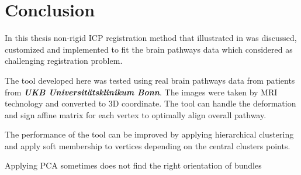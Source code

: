 \documentclass[../structure.tex]{subfiles}
\begin{document}
\chapter{Conclusion}
In this thesis non-rigid ICP registration method that illustrated in \cite{Amberg2007} was discussed, customized and implemented to fit the brain pathways data which considered as challenging registration problem. 

The tool developed here was tested using real brain pathways data from patients from \textbf{\textit{UKB Universitätsklinikum Bonn}}. The images were taken by MRI technology and converted to 3D coordinate. The tool can handle the deformation and sign affine matrix for each vertex to optimally align overall pathway.

The performance of the tool can be improved by applying hierarchical clustering and apply soft membership to vertices depending on the central clusters points.

Applying PCA sometimes does not find the right orientation of bundles
\end{document}
